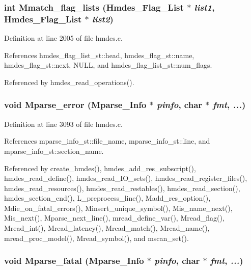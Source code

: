 \subsubsection{\setlength{\rightskip}{0pt plus 5cm}int Mmatch\_\-flag\_\-lists (\bf{Hmdes\_\-Flag\_\-List} $\ast$ {\em list1}, \bf{Hmdes\_\-Flag\_\-List} $\ast$ {\em list2})}\label{hmdes_8h_061dc0415202f6c4f9e89f83b5fe543b}




Definition at line 2005 of file hmdes.c.

References hmdes\_\-flag\_\-list\_\-st::head, hmdes\_\-flag\_\-st::name, hmdes\_\-flag\_\-st::next, NULL, and hmdes\_\-flag\_\-list\_\-st::num\_\-flags.

Referenced by hmdes\_\-read\_\-operations().
\subsubsection{\setlength{\rightskip}{0pt plus 5cm}void Mparse\_\-error (\bf{Mparse\_\-Info} $\ast$ {\em pinfo}, char $\ast$ {\em fmt},  {\em ...})}\label{hmdes_8h_de1ca8ab012e8d317504c9c9b16f566d}




Definition at line 3093 of file hmdes.c.

References mparse\_\-info\_\-st::file\_\-name, mparse\_\-info\_\-st::line, and mparse\_\-info\_\-st::section\_\-name.

Referenced by create\_\-hmdes(), hmdes\_\-add\_\-res\_\-subscript(), hmdes\_\-read\_\-define(), hmdes\_\-read\_\-IO\_\-sets(), hmdes\_\-read\_\-register\_\-files(), hmdes\_\-read\_\-resources(), hmdes\_\-read\_\-restables(), hmdes\_\-read\_\-section(), hmdes\_\-section\_\-end(), L\_\-preprocess\_\-line(), Madd\_\-res\_\-option(), Mdie\_\-on\_\-fatal\_\-errors(), Minsert\_\-unique\_\-symbol(), Mis\_\-name\_\-next(), Mis\_\-next(), Mparse\_\-next\_\-line(), mread\_\-define\_\-var(), Mread\_\-flag(), Mread\_\-int(), Mread\_\-latency(), Mread\_\-match(), Mread\_\-name(), mread\_\-proc\_\-model(), Mread\_\-symbol(), and mscan\_\-set().
\subsubsection{\setlength{\rightskip}{0pt plus 5cm}void Mparse\_\-fatal (\bf{Mparse\_\-Info} $\ast$ {\em pinfo}, char $\ast$ {\em fmt},  {\em ...})}\label{hmdes_8h_2b6eb17357b8952a79a4e3d4ce84a2ae}




